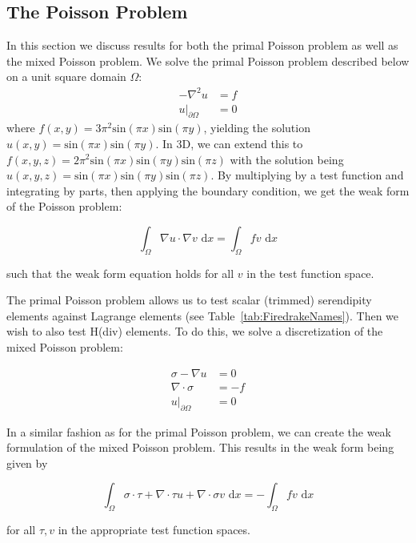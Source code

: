 \documentclass[manuscript,screen]{acmart}
\begin{document}
\subsection{The Poisson Problem}
In this section we discuss results for both the primal Poisson problem as well as the mixed Poisson problem.  We solve the primal Poisson problem described below on a unit square domain $\Omega$:
\begin{align}
    -\nabla^2 u &= f \\
    u\vert_{\partial \Omega} &= 0
\end{align}
where $f(x,y) = 3\pi^2\text{sin}(\pi x)\text{sin}(\pi y) $, yielding the solution $u(x,y) = \text{sin}(\pi x)\text{sin}(\pi y)$. In 3D, we can extend this to $f(x,y,z) = 2\pi^2\text{sin}(\pi x)\text{sin}(\pi y)\text{sin}(\pi z)$ with the solution being $u(x,y,z) = \text{sin}(\pi x)\text{sin}(\pi y)\text{sin}(\pi z)$.  By multiplying by a test function and integrating by parts, then applying the boundary condition, we get the weak form of the Poisson problem:

\begin{equation}
    \int_\Omega \nabla u \cdot \nabla v \text{ d}x = \int_\Omega f v \text{ d}x
\end{equation}

\noindent such that the weak form equation holds for all $v$ in the test function space.

The primal Poisson problem allows us to test scalar (trimmed) serendipity elements against Lagrange elements (see Table~\ref{tab:FiredrakeNames}).  Then we wish to also test H(div) elements.  To do this, we solve a discretization of the mixed Poisson problem:

\begin{align}
     \sigma - \nabla u &= 0 \\
     \nabla \cdot \sigma &= -f  \\
     u\vert_{\partial \Omega} &= 0 
\end{align}

In a similar fashion as for the primal Poisson problem, we can create the weak formulation of the mixed Poisson problem.  This results in the weak form being given by

\begin{equation}
    \int_\Omega \sigma \cdot \tau + \nabla \cdot \tau u + \nabla \cdot \sigma v \text{ d}x = - \int_\Omega fv \text{ d}x
\end{equation}

\noindent for all $\tau, v$ in the appropriate test function spaces.  
\end{document}
